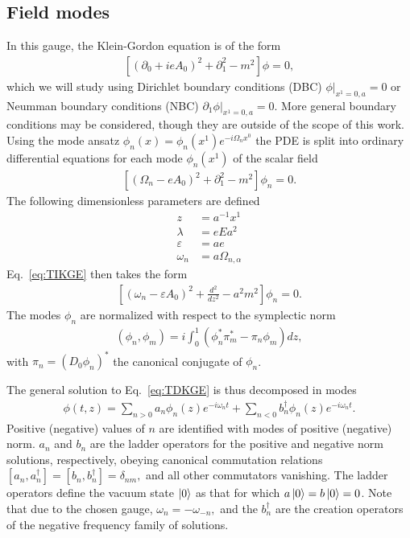 \subsection{Field modes}

In this gauge, the Klein-Gordon equation is of the form \begin{align}
    \left[ (\partial_0 + ie A_0 )^2 + \partial_1^2 - m^2
    \right]\phi = 0,
    \label{eq:TDKGE}
\end{align}
which we will study using Dirichlet boundary conditions (DBC) $\left.\phi \right|_{x^{1}=0,a} = 0$ or Neumman boundary conditions (NBC) $\left.\partial_{1} \phi\right|_{x^1=0,a }=0$. More general boundary conditions may be considered, though they are outside of the scope of this work.
Using the mode ansatz $\phi_n(x) = \phi_n (x^{1}) e^{-i\Omega_n x^0}$  the PDE is split into ordinary differential equations for each mode $\phi_n (x^{1})$ of the scalar field
\begin{align}
    \left[ (\Omega_n - e A_0 )^2 + \partial_{1}^2 -  m^2 \right]\phi_n
    = 0.
    \label{eq:TIKGE}
\end{align}
The following dimensionless parameters are defined
\begin{subequations}
    \begin{align}
z &= a^{-1}x^1\\
\lambda &= e E a^2\\
\varepsilon &= ae\\
\omega_{n} &= a\Omega_{n, \alpha}
\end{align}
\end{subequations}
Eq.~\eqref{eq:TIKGE} then takes the form \begin{align}
    \left[ (\omega_n - \varepsilon A_0 )^2 + \frac{d^2}{dz^2} - a^2
    m^2\right] \phi_n = 0.  \label{eq:mode-equation}
\end{align}
The modes $\phi_n$ are normalized with respect to the symplectic
norm
\begin{align}
    (\phi_n, \phi_m) = i\int_{0}^{1} (\phi_n^* \pi_m^* - \pi_n \phi_m)dz,
\end{align}
with $\pi_n = (D_0 \phi_n)^*$ the canonical conjugate of
$\phi_n$.

The general solution to Eq.~\eqref{eq:TDKGE} is thus decomposed in
modes \begin{align}
    \phi(t, z) = \sum_{n>0}^{} a_n \phi_n(z) e^{-i\omega_n t} +
    \sum_{n<0}^{} b^\dagger_n \phi_n(z) e^{-i\omega_n t}.
    \label{eq:mode-decomposition}
\end{align} Positive (negative) values of $n$ are identified with modes of positive
(negative) norm. $a_n$ and $b_n$ are the ladder operators for the positive and
negative norm solutions, respectively, obeying canonical commutation relations
$
    [a_n, a_n^\dagger ] = [b_n, b_n^\dagger ] =\delta_{nm},
$
and all other commutators vanishing. The ladder operators define
the vacuum state $\ket{0}$ as that for which $a \ket{0} = b\ket{0} = 0$. Note that due to the chosen gauge, $\omega_n = -\omega_{-n},$ and the $b_n^\dagger$  are the creation operators of the negative frequency family of solutions. 

